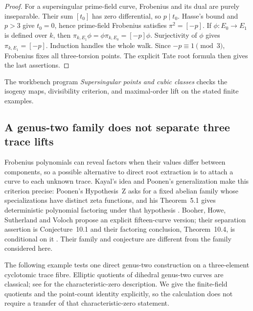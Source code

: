 \documentclass[11pt]{article}
\theoremstyle{definition}
\theoremstyle{remark}
\begin{document}
\begin{proof}
For a supersingular prime-field curve, Frobenius and its
dual are purely inseparable.  Their sum $[t_0]$ has zero
differential, so $p\mid t_0$.  Hasse's bound and $p>3$
give $t_0=0$, hence prime-field Frobenius satisfies
$\pi^2=[-p]$.  If $\phi:E_0\to E_1$ is defined over $k$,
then $\pi_{k,E_1}\phi=\phi\pi_{k,E_0}=[-p]\phi$.
Surjectivity of $\phi$ gives $\pi_{k,E_1}=[-p]$.
Induction handles the whole walk.  Since $-p\equiv1\pmod3$,
Frobenius fixes all three-torsion points.  The explicit Tate
root formula then gives the last assertions.
\end{proof}

The workbench program \emph{Supersingular points and cubic classes} checks the isogeny maps, divisibility criterion, and maximal-order lift on the stated finite examples.

\subsection{A genus-two family does not separate three trace lifts}
\label{sec:genus-two-trace-collision}
Frobenius polynomials can reveal factors when their values differ between
components, so a possible alternative to direct root extraction is to
attach a curve to each unknown trace. Kayal's idea and Poonen's
generalization make this criterion precise: Poonen's Hypothesis~Z asks
for a fixed abelian family whose specializations have distinct zeta
functions, and his Theorem~5.1 gives deterministic polynomial factoring
under that hypothesis \citep[author pp.~2--5]{Poonen2019}.
Booher, Howe, Sutherland and Voloch propose an explicit fifteen-curve
version; their separation assertion is Conjecture~10.1 and their
factoring conclusion, Theorem~10.4, is conditional on it
\citep[pp.~38--41]{BooherEtAl2026}. Their family and conjecture are
different from the family considered here.

The following example tests one direct genus-two construction on a
three-element cyclotomic trace fibre. Elliptic quotients of dihedral
genus-two curves are classical; see
\citet[Section~5, Proposition~5.1, author pp.~19--20]{CardonaQuer2002}
for the characteristic-zero description. We give the finite-field
quotients and the point-count identity explicitly, so the calculation
does not require a transfer of that characteristic-zero statement.
\end{document}
